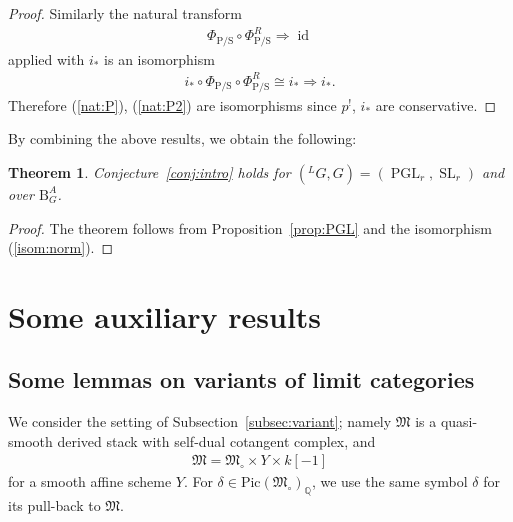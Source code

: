 \documentclass[11pt,oneside,a4paper,mathscr]{amsart}
\newtheorem{thm}{Theorem}[section]
\theoremstyle{definition}
\newcommand{\rB}{\mathrm{B}}
\newcommand{\id}{\operatorname{id}}
\newcommand{\SL}{\operatorname{SL}}
\newcommand{\PGL}{\operatorname{PGL}}
\newcommand{\rS}{\mathrm{S}}
\newcommand{\rP}{\mathrm{P}}
\begin{document}
\begin{proof}
Similarly the natural transform 
\begin{align}\label{nat:P2}
    \Phi_{\rP/\rS}\circ \Phi_{\rP/\rS}^R \Rightarrow \id
\end{align}
applied with $i_{*}$ is an isomorphism 
\begin{align*}
    i_{*}\circ \Phi_{\rP/\rS} \circ \Phi_{\rP/\rS}^R \cong i_{*} \Rightarrow i_{*}.
\end{align*}
Therefore (\ref{nat:P}), (\ref{nat:P2}) are isomorphisms since $p^!$, $i_{*}$ are conservative. 
\end{proof}

By combining the above results, we obtain the following: 
\begin{thm}\label{thm:PGL}
Conjecture~\ref{conj:intro} holds for $(^{L}G, G)=(\PGL_r, \SL_r)$ and 
over $\rB_{G}^A$. 
\end{thm}
\begin{proof}
    The theorem follows from Proposition~\ref{prop:PGL}
    and the isomorphism (\ref{isom:norm}). 
\end{proof}

\section{Some auxiliary results}
\subsection{Some lemmas on variants of limit categories}
We consider the setting of Subsection~\ref{subsec:variant}; 
namely $\mathfrak{M}$ is a quasi-smooth derived stack with self-dual 
cotangent complex, and 
\begin{align*}
    \mathfrak{M}=\mathfrak{M}_{\circ}\times Y\times k[-1]
\end{align*}
for a smooth affine scheme $Y$. For $\delta \in \mathrm{Pic}(\mathfrak{M}_{\circ})_{\mathbb{Q}}$, we use the same symbol $\delta$ for
its pull-back to $\mathfrak{M}$. 
\end{document}
